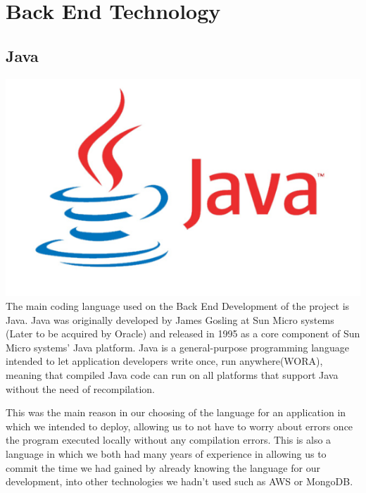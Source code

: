 \section{Back End Technology}

\subsection{Java}
\includegraphics[scale = 0.6]{img/java-logo-1.png}\newline
The main coding language used on the Back End Development of the project is Java. Java was originally developed by James Gosling at Sun Micro systems (Later to be acquired by Oracle) and released in 1995 as a core component of Sun Micro systems' Java platform. Java is a general-purpose programming language intended to let application developers write once, run anywhere(WORA), meaning that compiled Java code can run on all platforms that support Java without the need of recompilation. \par
This was the main reason in our choosing of the language for an application in which we intended to deploy, allowing us to not have to worry about errors once the program executed locally without any compilation errors. This is also a language in which we both had many years of experience in allowing us to commit the time we had gained by already knowing the language for our development, into other technologies we hadn't used such as AWS or MongoDB.

